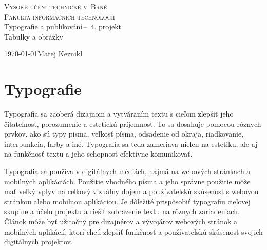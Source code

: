 \documentclass[a4paper, 11pt]{article}
\begin{document}
\begin{titlepage}
	\begin{center} 
		\textsc{\Huge Vysoké učení technické v~Brně\\
			\huge Fakulta informačních technologií \\}
			\LARGE Typografie a publikování\,--\ 4. projekt\\
			\Huge Tabulky a obrázky
			\end{center}
			\Large \today \hfill Matej Keznikl
\end{titlepage}



\section{Typografie}
Typografia sa zaoberá dizajnom a vytváraním textu s cieľom zlepšiť jeho čitateľnosť, porozumenie a estetickú príjemnosť. To sa dosahuje pomocou rôznych prvkov, ako sú typy písma, veľkosť písma, odsadenie od okraja, riadkovanie, interpunkcia, farby a iné. Typografia sa teda zameriava nielen na estetiku, ale aj na funkčnosť textu a jeho schopnosť efektívne komunikovať. \cite{KNUTH}

Typografia sa používa v digitálnych médiách, najmä na webových stránkach a mobilných aplikáciách. Použitie vhodného písma a jeho správne použitie môže mať veľký vplyv na celkový vizuálny dojem a používateľskú skúsenosť s webovou stránkou alebo mobilnou aplikáciou. Je dôležité prispôsobiť typografiu cieľovej skupine a účelu projektu a riešiť zobrazenie textu na rôznych zariadeniach. Článok môže byť užitočný pre dizajnérov a vývojárov webových stránok a mobilných aplikácií, ktorí chcú zlepšiť funkčnosť a používateľskú skúsenosť svojich digitálnych projektov. \cite{WebsiteDesign}
\end{document}
